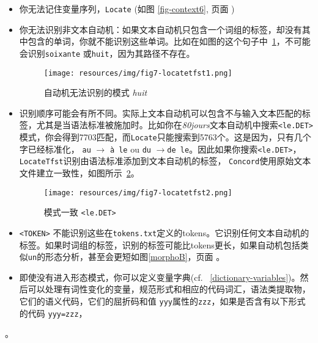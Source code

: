 \begin{itemize}
    \item 你无法记住变量序列，\verb+Locate+
    	    (如图 \ref{fig-context6}, 页面 \pageref{fig-context6})
    \item 
    你无法识别非文本自动机：如果文本自动机只包含一个词组的标签，却没有其中包含的单词，你就不能识别这些单词。比如在如图的这个句子中~\ref{fig7-locatetfst1}，不可能会识别\verb+soixante+ 或\verb+huit+，因为其路径不存在。

    
\begin{figure}[!ht]
\begin{center}
\texttt{[image: resources/img/fig7-locatetfst1.png]}
\caption{自动机无法识别的模式
\textit{huit}\label{fig7-locatetfst1}}
\end{center}
\end{figure}

\item 
识别顺序可能会有所不同。实际上文本自动机可以包含不与输入文本匹配的标签，尤其是当语法标准被施加时。比如你在\textit{80jours}文本自动机中搜索\verb+<le.DET>+ 模式，你会得到7703匹配，而\verb+Locate+只能搜索到5763个。这是因为，只有几个字已经标准化， \verb+au+
	$\rightarrow$ \verb+à le+ ou \verb+du+ $\rightarrow$\verb+de le+。因此如果你搜索\verb+<le.DET>+， \verb+LocateTfst+识别由语法标准添加到文本自动机的标签， \verb+Concord+使用原始文本文件建立一致性，如图所示~\ref{fig7-locatetfst2}。



\begin{figure}[!ht]
\begin{center}
\texttt{[image: resources/img/fig7-locatetfst2.png]}
\caption{模式一致
\texttt{<le.DET>}\label{fig7-locatetfst2}}
\end{center}
\end{figure}

\item \verb+<TOKEN>+ 
不能识别这些在\verb+tokens.txt+定义的tokens。它识别任何文本自动机的标签。如果时词组的标签，识别的标签可能比tokens更长，如果自动机包括类似\verb+un+的形态分析，甚至会更短如图\ref{morphoB}，页面	\pageref{morphoB}。



\item 

即使没有进入形态模式，你可以定义变量字典(cf. ~\ref{dictionary-variables})。然后可以处理有词性变化的变量，规范形式和相应的代码词汇，语法类提取物，
它们的语义代码，它们的屈折码和值 \verb+yyy+属性的\verb+zzz+，如果是否含有以下形式的代码 \verb+yyy=zzz+，\end{itemize}。




